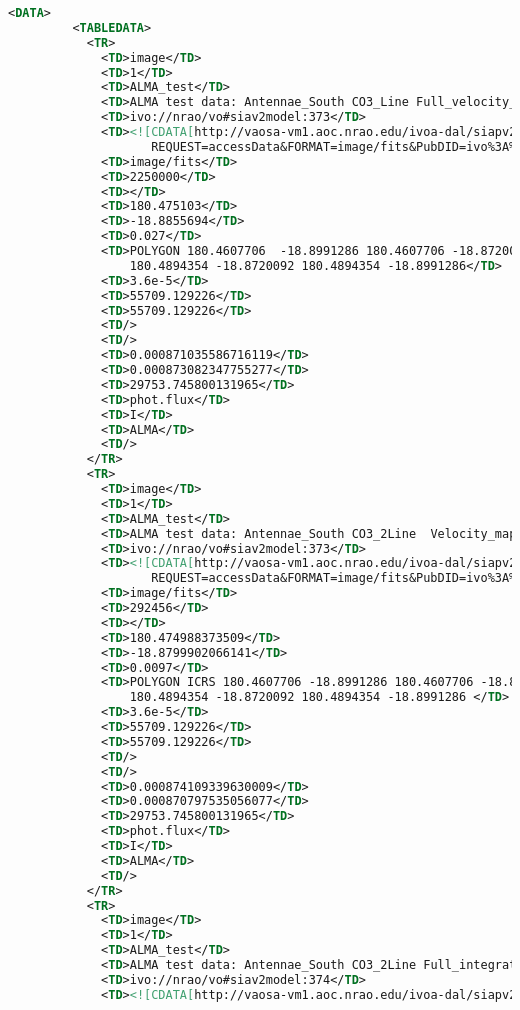 \documentclass[11pt,a4paper]{ivoa}
\begin{document}
\begin{lstlisting}[basicstyle=\scriptsize,language=XML]
       <DATA>
         <TABLEDATA>
           <TR>
             <TD>image</TD>
             <TD>1</TD>
             <TD>ALMA_test</TD>
             <TD>ALMA test data: Antennae_South CO3_Line Full_velocity_map</TD>
             <TD>ivo://nrao/vo#siav2model:373</TD>
             <TD><![CDATA[http://vaosa-vm1.aoc.nrao.edu/ivoa-dal/siapv2-vao/sync?
                    REQUEST=accessData&FORMAT=image/fits&PubDID=ivo%3A%2F%2Fnrao%2Fvo%23siav2model%3A373]]></TD>
             <TD>image/fits</TD>
             <TD>2250000</TD>
             <TD></TD>
             <TD>180.475103</TD>
             <TD>-18.8855694</TD>
             <TD>0.027</TD>
             <TD>POLYGON 180.4607706  -18.8991286 180.4607706 -18.8720092
                 180.4894354 -18.8720092 180.4894354 -18.8991286</TD>
             <TD>3.6e-5</TD>
             <TD>55709.129226</TD>
             <TD>55709.129226</TD>
             <TD/>
             <TD/>
             <TD>0.000871035586716119</TD>
             <TD>0.000873082347755277</TD>
             <TD>29753.745800131965</TD>
             <TD>phot.flux</TD>
             <TD>I</TD>
             <TD>ALMA</TD>
             <TD/>
           </TR>
           <TR>
             <TD>image</TD>
             <TD>1</TD>
             <TD>ALMA_test</TD>
             <TD>ALMA test data: Antennae_South CO3_2Line  Velocity_map_cutout</TD>
             <TD>ivo://nrao/vo#siav2model:373</TD>
             <TD><![CDATA[http://vaosa-vm1.aoc.nrao.edu/ivoa-dal/siapv2-vao/sync?
                    REQUEST=accessData&FORMAT=image/fits&PubDID=ivo%3A%2F%2Fnrao%2Fvo%23image-ZSKuYR]]></TD>
             <TD>image/fits</TD>
             <TD>292456</TD>
             <TD></TD>
             <TD>180.474988373509</TD>
             <TD>-18.8799902066141</TD>
             <TD>0.0097</TD>
             <TD>POLYGON ICRS 180.4607706 -18.8991286 180.4607706 -18.8720092
                 180.4894354 -18.8720092 180.4894354 -18.8991286 </TD>
             <TD>3.6e-5</TD>
             <TD>55709.129226</TD>
             <TD>55709.129226</TD>
             <TD/>
             <TD/>
             <TD>0.000874109339630009</TD>
             <TD>0.000870797535056077</TD>
             <TD>29753.745800131965</TD>
             <TD>phot.flux</TD>
             <TD>I</TD>
             <TD>ALMA</TD>
             <TD/>
           </TR>
           <TR>
             <TD>image</TD>
             <TD>1</TD>
             <TD>ALMA_test</TD>
             <TD>ALMA test data: Antennae_South CO3_2Line Full_integrated_intensity</TD>
             <TD>ivo://nrao/vo#siav2model:374</TD>
             <TD><![CDATA[http://vaosa-vm1.aoc.nrao.edu/ivoa-dal/siapv2-vao/sync?

\end{lstlisting}
\end{document}
